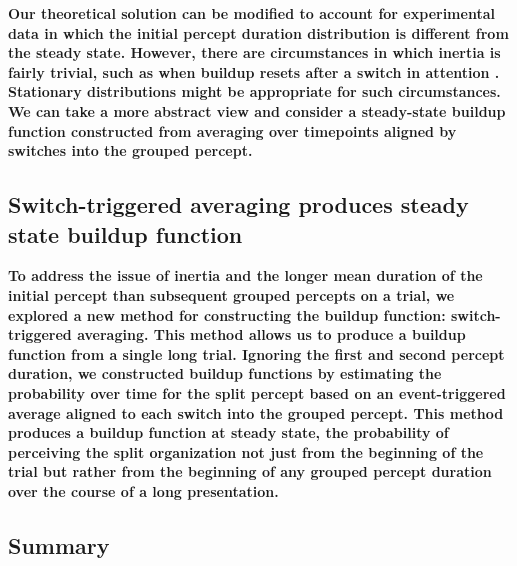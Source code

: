 \documentclass[10pt]{article}
\begin{document}
\textbf{Our theoretical solution can be modified to account for experimental data in which the initial percept duration distribution is different from the steady state. However, there are circumstances in which inertia is fairly trivial, such as when buildup resets after a switch in attention \cite{Denham2010}. Stationary distributions might be appropriate for such circumstances. We can take a more abstract view and consider a steady-state buildup function constructed from averaging over timepoints aligned by switches into the grouped percept.}

\subsection*{Switch-triggered averaging produces steady state buildup function}

\textbf{To address the issue of inertia and the longer mean duration of the initial percept than subsequent grouped percepts on a trial, we explored a new method for constructing the buildup function: switch-triggered averaging. This method allows us to produce a buildup function from a single long trial. Ignoring the first and second percept duration, we constructed buildup functions by estimating the probability over time for the split percept based on an event-triggered average aligned to each switch into the grouped percept. This method produces a buildup function at steady state, the probability of perceiving the split organization not just from the beginning of the trial but rather from the beginning of any grouped percept duration over the course of a long presentation.} %

\subsection*{Summary}






\end{document}
